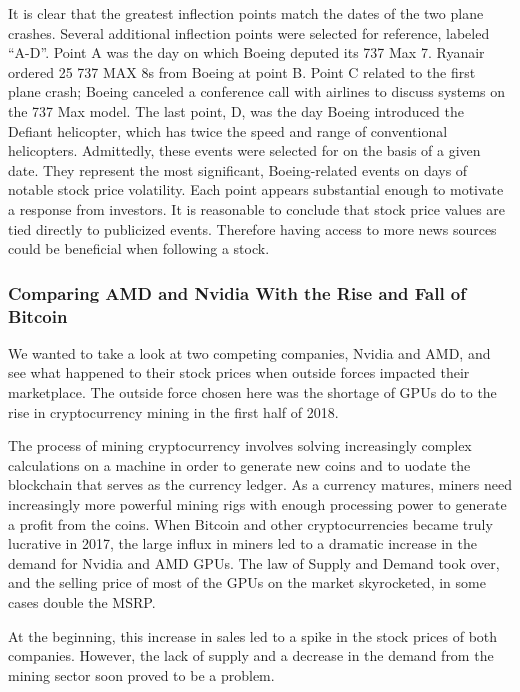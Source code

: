 \documentclass[]{article}
\begin{document}
It is clear that the greatest inflection points match the dates of the
two plane crashes. Several additional inflection points were selected
for reference, labeled ``A-D''. Point A was the day on which Boeing
deputed its 737 Max 7. Ryanair ordered 25 737 MAX 8s from Boeing at
point B. Point C related to the first plane crash; Boeing canceled a
conference call with airlines to discuss systems on the 737 Max model.
The last point, D, was the day Boeing introduced the Defiant helicopter,
which has twice the speed and range of conventional helicopters.
Admittedly, these events were selected for on the basis of a given date.
They represent the most significant, Boeing-related events on days of
notable stock price volatility. Each point appears substantial enough to
motivate a response from investors. It is reasonable to conclude that
stock price values are tied directly to publicized events. Therefore
having access to more news sources could be beneficial when following a
stock.

\hypertarget{comparing-amd-and-nvidia-with-the-rise-and-fall-of-bitcoin}{%
\subsubsection{Comparing AMD and Nvidia With the Rise and Fall of
Bitcoin}\label{comparing-amd-and-nvidia-with-the-rise-and-fall-of-bitcoin}}

We wanted to take a look at two competing companies, Nvidia and AMD, and
see what happened to their stock prices when outside forces impacted
their marketplace. The outside force chosen here was the shortage of
GPUs do to the rise in cryptocurrency mining in the first half of 2018.

The process of mining cryptocurrency involves solving increasingly
complex calculations on a machine in order to generate new coins and to
uodate the blockchain that serves as the currency ledger. As a currency
matures, miners need increasingly more powerful mining rigs with enough
processing power to generate a profit from the coins. When Bitcoin and
other cryptocurrencies became truly lucrative in 2017, the large influx
in miners led to a dramatic increase in the demand for Nvidia and AMD
GPUs. The law of Supply and Demand took over, and the selling price of
most of the GPUs on the market skyrocketed, in some cases double the
MSRP.

At the beginning, this increase in sales led to a spike in the stock
prices of both companies. However, the lack of supply and a decrease in
the demand from the mining sector soon proved to be a problem.
\end{document}
